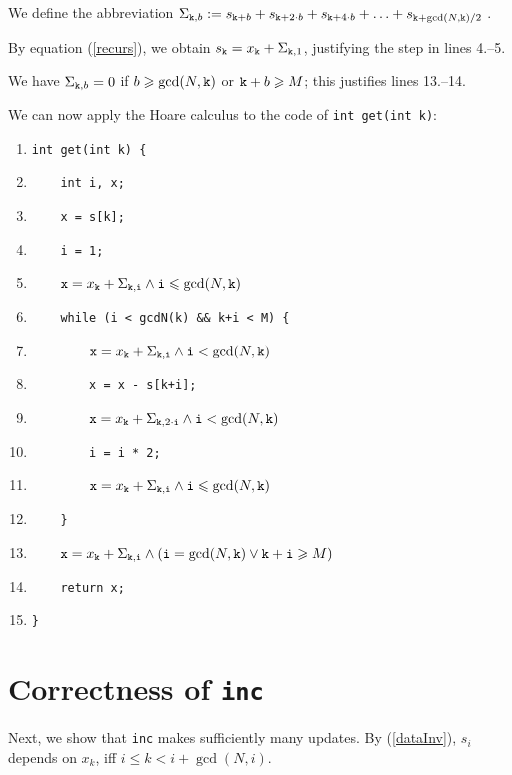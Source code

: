 \documentclass{elsartNoFoot}
\newcommand{\1}{\color{red}}
\newcommand{\2}{\color{green}}
\renewcommand{\leq}{\leqslant}		\renewcommand{\geq}{\geqslant}
\newcommand{\X}[1]{x_{#1}}		\renewcommand{\S}[1]{s_{#1}}
\newcommand{\+}[3]{{\renewcommand{\i}{{#1}}{#3},\ldots,\renewcommand{\i}{{#2}}{#3}}}
\newcommand{\ti}{{\tt i}}		\newcommand{\tk}{{\tt k}}
\renewcommand{\exp}[1]{\gcd(N,#1)}
\newcommand{\SUM}[1]{\Sigma_{#1}}
\begin{document}
We define the abbreviation
$\SUM{\tk,b} 
:= \S{\tk+b} + \S{\tk+2\cdot b} + \S{\tk+4\cdot b} 
+ \ldots + \S{\tk+\exp{\tk}/2}$ .

By equation (\ref{recurs}), we obtain 
$\S{\tk} = \X{\tk} + \SUM{\tk,1}$, 
justifying the step in lines 4.--5.

We have $\SUM{\tk,b} = 0$ if $b \geq \exp{\tk}$ or
$\tk+b \geq M$; this justifies lines 13.--14.

We can now apply the Hoare calculus to the code of
\verb|int get(int k)|:

\begin{enumerate}
\setlength{\itemsep}{-0.0cm}
\renewcommand{\labelenumi}{\arabic{enumi}.}
 \item{\1\verb|int get(int k) {					|
}\item{\1\verb|    int i, x;					|
}\item{\1\verb|    x = s[k];					|
}\item{\1\verb|    i = 1;					|
}\item{\2\verb|    |${\tt x} = \X{\tk} + \SUM{\tk,\ti}
	\wedge \ti \leq \exp{\tk}$
}\item{\1\verb|    while (i < gcdN(k) && k+i < M) {		|
}\item{\2\verb|        |${\tt x} = \X{\tk} + \SUM{\tk,\ti}
	\wedge \ti < \exp{\tk}$
}\item{\1\verb|        x = x - s[k+i];				|
}\item{\2\verb|        |${\tt x} = \X{\tk} + \SUM{\tk,2\cdot\ti}
	\wedge \ti < \exp{\tk}$
}\item{\1\verb|        i = i * 2;				|
}\item{\2\verb|        |${\tt x} = \X{\tk} + \SUM{\tk,\ti}
	\wedge \ti \leq \exp{\tk}$
}\item{\1\verb|    }						|
}\item{\2\verb|    |${\tt x} = \X{\tk} + \SUM{\tk,\ti}
	\wedge (\ti = \exp{\tk} \vee \tk+\ti \geq M)$
}\item{\1\verb|    return x;					|
}\item{\1\verb|}						|
}
\end{enumerate}





\section{Correctness of {\tt inc}}
\label{Correctness of inc}

Next, we show that {\tt inc} makes sufficiently many updates.
By (\ref{dataInv}),
$\S{i}$ depends on $\X{k}$, 
iff
$i \leq k < i+\exp{i}$.
\end{document}
